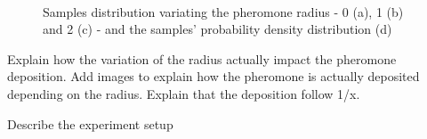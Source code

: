\begin{figure}[H]
\myfloatalign
{} \quad
{} \\
 \quad
{}

\caption[Radius variation - samples distributions]{Samples distribution variating the pheromone radius - 0 (a), 1 (b) and 2 (c) - and the samples' probability density distribution (d)}\label{fig:radius}
\end{figure}







Explain how the variation of the radius actually impact the pheromone deposition. Add images to explain how the pheromone is actually deposited depending on the radius. Explain that the deposition follow 1/x.

Describe the experiment setup

